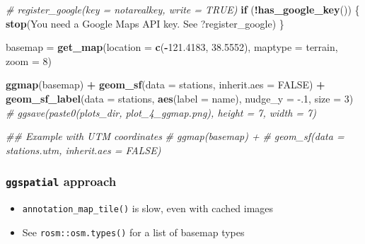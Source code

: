 \documentclass[
]{article}
\newenvironment{Shaded}{\begin{snugshade}}{\end{snugshade}}
\newcommand{\CommentTok}[1]{\textcolor[rgb]{0.56,0.35,0.01}{\textit{#1}}}
\newcommand{\ControlFlowTok}[1]{\textcolor[rgb]{0.13,0.29,0.53}{\textbf{#1}}}
\newcommand{\DataTypeTok}[1]{\textcolor[rgb]{0.13,0.29,0.53}{#1}}
\newcommand{\DecValTok}[1]{\textcolor[rgb]{0.00,0.00,0.81}{#1}}
\newcommand{\FloatTok}[1]{\textcolor[rgb]{0.00,0.00,0.81}{#1}}
\newcommand{\KeywordTok}[1]{\textcolor[rgb]{0.13,0.29,0.53}{\textbf{#1}}}
\newcommand{\NormalTok}[1]{#1}
\newcommand{\OperatorTok}[1]{\textcolor[rgb]{0.81,0.36,0.00}{\textbf{#1}}}
\newcommand{\OtherTok}[1]{\textcolor[rgb]{0.56,0.35,0.01}{#1}}
\newcommand{\StringTok}[1]{\textcolor[rgb]{0.31,0.60,0.02}{#1}}
\providecommand{\tightlist}{%
  \setlength{\itemsep}{0pt}\setlength{\parskip}{0pt}}
\begin{document}
\begin{Shaded}
\begin{Highlighting}[]
\CommentTok{\# register\_google(key = \textquotesingle{}notarealkey\textquotesingle{}, write = TRUE)}
\ControlFlowTok{if}\NormalTok{ (}\OperatorTok{!}\KeywordTok{has\_google\_key}\NormalTok{()) \{}
    \KeywordTok{stop}\NormalTok{(}\StringTok{\textquotesingle{}You need a Google Maps API key.  See ?register\_google\textquotesingle{}}\NormalTok{)}
\NormalTok{\}}

\NormalTok{basemap =}\StringTok{ }\KeywordTok{get\_map}\NormalTok{(}\DataTypeTok{location =} \KeywordTok{c}\NormalTok{(}\OperatorTok{{-}}\FloatTok{121.4183}\NormalTok{, }\FloatTok{38.5552}\NormalTok{), }
                  \DataTypeTok{maptype =} \StringTok{\textquotesingle{}terrain\textquotesingle{}}\NormalTok{,}
                  \DataTypeTok{zoom =} \DecValTok{8}\NormalTok{)}

\KeywordTok{ggmap}\NormalTok{(basemap) }\OperatorTok{+}
\StringTok{    }\KeywordTok{geom\_sf}\NormalTok{(}\DataTypeTok{data =}\NormalTok{ stations, }\DataTypeTok{inherit.aes =} \OtherTok{FALSE}\NormalTok{) }\OperatorTok{+}
\StringTok{    }\KeywordTok{geom\_sf\_label}\NormalTok{(}\DataTypeTok{data =}\NormalTok{ stations, }
                  \KeywordTok{aes}\NormalTok{(}\DataTypeTok{label =}\NormalTok{ name), }\DataTypeTok{nudge\_y =} \FloatTok{{-}.1}\NormalTok{, }\DataTypeTok{size =} \DecValTok{3}\NormalTok{)}
\CommentTok{\# ggsave(paste0(plots\_dir, \textquotesingle{}plot\_4\_ggmap.png\textquotesingle{}), height = 7, width = 7)}

\CommentTok{\#\# Example with UTM coordinates}
\CommentTok{\# ggmap(basemap) +}
\CommentTok{\#     geom\_sf(data = stations.utm, inherit.aes = FALSE)}
\end{Highlighting}
\end{Shaded}

\hypertarget{ggspatial-approach}{%
\subsubsection{\texorpdfstring{\texttt{ggspatial} approach}{ggspatial approach}}\label{ggspatial-approach}}

\begin{itemize}
\tightlist
\item
  \texttt{annotation\_map\_tile()} is slow, even with cached images
\item
  See \texttt{rosm::osm.types()} for a list of basemap types
\end{itemize}
\end{document}
